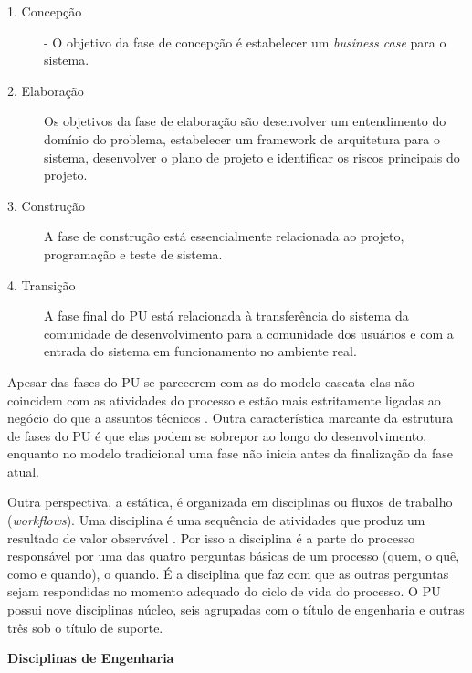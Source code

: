 \documentclass[
	article,			%
	11pt,				%
	oneside,			%
	a4paper,			%
	english,			%
	brazil,				%
	sumario=tradicional
	]{abntex2}
\begin{document}
\begin{description}
   \item[1. Concepção] - O objetivo da fase de concepção é estabelecer um
   \textit{business case} para o sistema.
   \item[2. Elaboração] Os objetivos da fase de elaboração são desenvolver um
   entendimento do domínio do problema, estabelecer um framework de arquitetura
   para o sistema, desenvolver o plano de projeto e identificar os riscos
   principais do projeto.
   \item[3. Construção] A fase de construção está essencialmente relacionada ao
   projeto, programação e teste de sistema.
   \item[4. Transição] A fase final do PU está relacionada à transferência do
   sistema da comunidade de desenvolvimento para a comunidade dos usuários e com
   a entrada do sistema em funcionamento no ambiente real.
\end{description}

Apesar das fases do PU se parecerem com as do modelo cascata elas não coincidem
com as atividades do processo e estão mais estritamente ligadas ao negócio do
que a assuntos técnicos \cite{sommerville2007}. Outra característica marcante
da estrutura de fases do PU é que elas podem se sobrepor ao longo do
desenvolvimento, enquanto no modelo tradicional uma fase não inicia antes da
finalização da fase atual.

Outra perspectiva, a estática, é organizada em disciplinas ou fluxos de trabalho
(\textit{workflows}). Uma disciplina é uma sequência de atividades que produz um
resultado de valor observável \cite{Corporation1998}. Por isso a disciplina é a
parte do processo responsável por uma das quatro perguntas básicas de um
processo (quem, o quê, como e quando), o quando. É a disciplina que faz com que
as outras perguntas sejam respondidas no momento adequado do ciclo de vida do
processo. O PU possui nove disciplinas núcleo, seis agrupadas com o título de
engenharia e outras três sob o título de suporte.

\textbf{Disciplinas de Engenharia}
\end{document}
